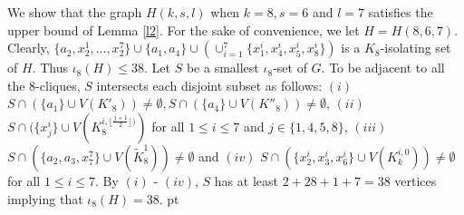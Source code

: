 \documentclass[11pt]{article}
\newcommand{\2}{ \vspace{0.2cm} }
\newcommand{\1}{ \vspace{0.1cm} }
\begin{document}







We show that the graph $H(k, s, l)$ when $k = 8, s = 6$ and $l = 7$ satisfies the upper bound of Lemma \ref{l2}. For the sake of convenience, we let $H = H(8, 6, 7)$. Clearly, $\{a_{2}, x^{1}_{2}, ..., x^{7}_{2}\} \cup \{a_{1}, a_{4}\} \cup (\cup^{7}_{i = 1}\{x^{i}_{1}, x^{i}_{4}, x^{i}_{5}, x^{i}_{8}\})$ is a $K_8$-isolating set of $H$. Thus $\iota_{8}(H) \leq 38$. Let $S$ be a smallest $\iota_{8}$-set of $G$. To be adjacent to all the $8$-cliques, $S$ intersects each disjoint subset as follows: $(i)$ $S \cap (\{a_{1}\} \cup V(K'_{8})) \neq \emptyset, S \cap (\{a_{4}\} \cup V(K''_{8})) \neq \emptyset$, $(ii)$ $S \cap (\{x^{i}_{j}\} \cup V(K^{i, \lfloor\frac{j + 1}{2}\rfloor)}_{8})$ for all $1 \leq i \leq 7$ and $j \in \{1, 4, 5, 8\}$, $(iii)$ $S \cap (\{a_{2}, a_{3}, x^{7}_{7}\} \cup V(\tilde{K}^{1}_{8})) \neq \emptyset$ and $(iv)$ $S \cap (\{x^{i}_{2}, x^{i}_{3}, x^{i}_{6}\} \cup V(K^{i, 0}_{k})) \neq \emptyset$ for all $1 \leq i \leq 7$. By $(i)$ - $(iv)$, $S$ has at least $2 + 28 + 1 + 7 = 38$ vertices implying that $\iota_{8}(H) = 38$.
 pt
\end{document}
